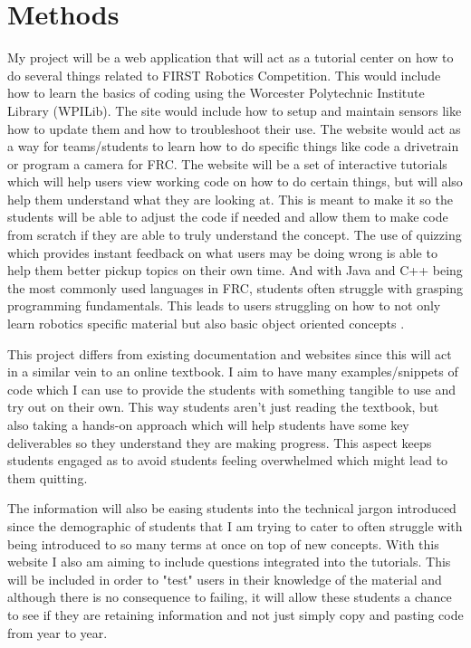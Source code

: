 \documentclass[10pt,twocolumn]{article}
\begin{document}
\section{Methods}

My project will be a web application that will act as a tutorial center on how to do several things related to FIRST Robotics Competition. This would include how to learn the basics of coding using the Worcester Polytechnic Institute Library (WPILib). The site would include how to setup and maintain sensors like how to update them and how to troubleshoot their use. The website would act as a way for teams/students to learn how to do specific things like code a drivetrain or program a camera for FRC. The website will be a set of interactive tutorials which will help users view working code on how to do certain things, but will also help them understand what they are looking at. This is meant to make it so the students will be able to adjust the code if needed and allow them to make code from scratch if they are able to truly understand the concept. The use of quizzing which provides instant feedback on what users may be doing wrong is able to help them better pickup topics on their own time\cite{IntroProgrammingInteractive}. And with Java and C++ being the most commonly used languages in FRC, students often struggle with grasping programming fundamentals. This leads to users struggling on how to not only learn robotics specific material but also basic object oriented concepts \cite{ImplementingInteractiveTutorials}.

This project differs from existing documentation and websites since this will act in a similar vein to an online textbook. I aim to have many examples/snippets of code which I can use to provide the students with something tangible to use and try out on their own. This way students aren't just reading the textbook, but also taking a hands-on approach which will help students have some key deliverables so they understand they are making progress. This aspect keeps students engaged as to avoid students feeling overwhelmed which might lead to them quitting.

The information will also be easing students into the technical jargon introduced since the demographic of students that I am trying to cater to often struggle with being introduced to so many terms at once on top of new concepts.  With this website I also am aiming to include questions integrated into the tutorials. This will be included in order to "test" users in their knowledge of the material and although there is no consequence to failing, it will allow these students a chance to see if they are retaining information and not just simply copy and pasting code from year to year. 
\end{document}
